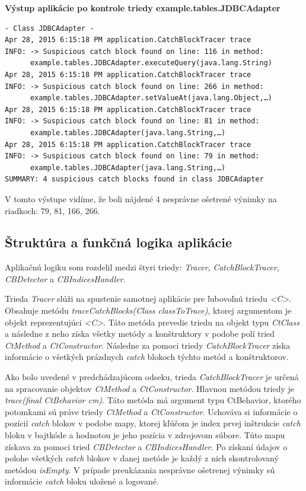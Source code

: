\documentclass[11pt,final,oneside]{fithesis}
\newenvironment{example}[1]
{
\vspace{3mm}
\noindent\textbf{#1}
\vspace{2mm}
}
{
\vspace{3mm}
}
\begin{document}
\begin{example}{Výstup aplikácie po kontrole triedy example.tables.JDBCAdapter}
\begin{verbatim}
- Class JDBCAdapter -
Apr 28, 2015 6:15:18 PM application.CatchBlockTracer trace
INFO: -> Suspicious catch block found on line: 116 in method:
      example.tables.JDBCAdapter.executeQuery(java.lang.String)
Apr 28, 2015 6:15:18 PM application.CatchBlockTracer trace
INFO: -> Suspicious catch block found on line: 266 in method:
      example.tables.JDBCAdapter.setValueAt(java.lang.Object,…)
Apr 28, 2015 6:15:18 PM application.CatchBlockTracer trace
INFO: -> Suspicious catch block found on line: 81 in method:
      example.tables.JDBCAdapter(java.lang.String,…)
Apr 28, 2015 6:15:18 PM application.CatchBlockTracer trace
INFO: -> Suspicious catch block found on line: 79 in method:
      example.tables.JDBCAdapter(java.lang.String,…)
SUMMARY: 4 suspicious catch blocks found in class JDBCAdapter
\end{verbatim}
\end{example}

V tomto výstupe vidíme, že boli nájdené 4 nesprávne ošetrené výnimky na 
riadkoch: 79, 81, 166, 266.

\subsection{Štruktúra a funkčná logika aplikácie}
Aplikačnú logiku som rozdelil medzi štyri triedy: \textit{Tracer}, 
\textit{CatchBlockTracer}, \textit{CBDetector} a \textit{CBIndicesHandler}. 

Trieda \textit{Tracer} slúži na spustenie samotnej aplikácie pre ľubovoľnú 
triedu \textit{<C>}. Obsahuje metódu \textit{traceCatchBlocks(Class 
classToTrace)}, ktorej argumentom je objekt reprezentujúci \textit{<C>}. Táto 
metóda prevedie triedu na objekt typu \textit{CtClass} a následne z neho získa 
všetky metódy a konštruktory v podobe polí tried \textit{CtMethod} a 
\textit{CtConstructor}. Následne za pomoci triedy \textit{CatchBlockTracer} 
získa informácie o všetkých prázdnych \textit{catch} blokoch týchto metód a 
konštruktorov. 

Ako bolo uvedené v predchádzajúcom odseku, trieda \textit{CatchBlockTracer} je 
určená na spracovanie objektov \textit{CtMethod} a \textit{CtConstructor}. 
Hlavnou metódou triedy je \textit{trace(final CtBehavior cm)}. Táto metóda má 
argument typu CtBehavior, ktorého potomkami sú práve triedy \textit{CtMethod} a
\textit{CtConstructor}. Uchováva si informácie o pozícií \textit{catch} blokov 
v podobe mapy, ktorej kľúčom je index prvej inštrukcie \textit{catch} bloku v 
bajtkóde a hodnotou je jeho pozícia v zdrojovom súbore. Túto mapu získava za 
pomoci tried \textit{CBDetector} a \textit{CBIndicesHandler}. Po získaní 
údajov o polohe všetkých \textit{catch} blokov v danej metóde je každý z nich 
skontrolovaný metódou \textit{isEmpty}. V prípade preukázania nesprávne 
ošetrenej výnimky sú informácie \textit{catch} bloku uložené a logované. 
\end{document}
